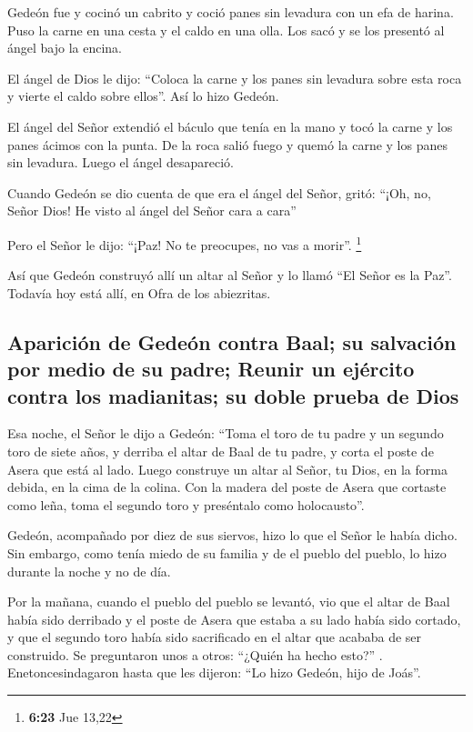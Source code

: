  Gedeón fue y cocinó un cabrito y coció panes sin
levadura con un efa de harina. Puso la carne en una cesta y el caldo en
una olla. Los sacó y se los presentó al ángel bajo la encina.

 El ángel de Dios le dijo: ``Coloca la carne y los panes
sin levadura sobre esta roca y vierte el caldo sobre ellos''. Así lo
hizo Gedeón.

 El ángel del Señor extendió el báculo que tenía en la
mano y tocó la carne y los panes ácimos con la punta. De la roca salió
fuego y quemó la carne y los panes sin levadura. Luego el ángel
desapareció.

 Cuando Gedeón se dio cuenta de que era el ángel del
Señor, gritó: ``¡Oh, no, Señor Dios! He visto al ángel del Señor cara a
cara''

 Pero el Señor le dijo: ``¡Paz! No te preocupes, no vas a
morir''. \footnote{\textbf{6:23} Jue 13,22}

 Así que Gedeón construyó allí un altar al Señor y lo
llamó ``El Señor es la Paz''. Todavía hoy está allí, en Ofra de los
abiezritas.

\hypertarget{apariciuxf3n-de-gedeuxf3n-contra-baal-su-salvaciuxf3n-por-medio-de-su-padre-reunir-un-ejuxe9rcito-contra-los-madianitas-su-doble-prueba-de-dios}{%
\subsection{Aparición de Gedeón contra Baal; su salvación por medio de
su padre; Reunir un ejército contra los madianitas; su doble prueba de
Dios}\label{apariciuxf3n-de-gedeuxf3n-contra-baal-su-salvaciuxf3n-por-medio-de-su-padre-reunir-un-ejuxe9rcito-contra-los-madianitas-su-doble-prueba-de-dios}}

 Esa noche, el Señor le dijo a Gedeón: ``Toma el toro de
tu padre y un segundo toro de siete años, y derriba el altar de Baal de
tu padre, y corta el poste de Asera que está al lado. 
Luego construye un altar al Señor, tu Dios, en la forma debida, en la
cima de la colina. Con la madera del poste de Asera que cortaste como
leña, toma el segundo toro y preséntalo como holocausto''.

 Gedeón, acompañado por diez de sus siervos, hizo lo que
el Señor le había dicho. Sin embargo, como tenía miedo de su familia y
de el pueblo del pueblo, lo hizo durante la noche y no de día.

 Por la mañana, cuando el pueblo del pueblo se levantó,
vio que el altar de Baal había sido derribado y el poste de Asera que
estaba a su lado había sido cortado, y que el segundo toro había sido
sacrificado en el altar que acababa de ser construido. 
Se preguntaron unos a otros: ``¿Quién ha hecho esto?'' .
Enetoncesindagaron hasta que les dijeron: ``Lo hizo Gedeón, hijo de
Joás''.

